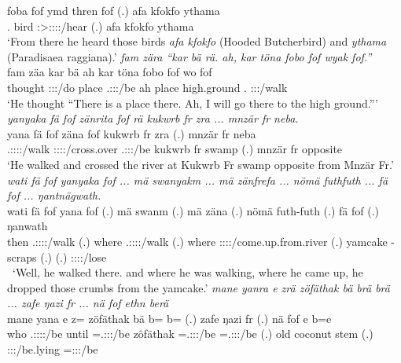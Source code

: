 \begin{exe}
	\gll foba fof ymd thren fof (.) {afa kfokfo} ythama\\ 
	\Dist.{\Abl} {\Emph} bird \Stsg:\Sbj>\Stpl:\Obj:\Irr:\Pfv:\Venit/hear {\Emph} (.) {afa kfokfo} ythama\\
	\trans `From there he heard those birds \emph{afa kfokfo} (Hooded Butcherbird) and \emph{ythama} (Paradisaea raggiana).'
	\emph{fam zära ``kar bä rä. ah, kar töna fobo fof wyak fof.''}\\
	\gll fam zäa kar bä  ah kar töna fobo fof wo fof\\ 
	thought \Sg:\Sbj:\Pst:\Pfv/do place \Med{} \Tsg.\F:\Sbj:\Nonpast:\Ipfv/be ah place high.ground \Dist.{\All} {\Emph} \Fsg:\Sbj:\Nonpast:\Ipfv/walk \Emph\\
	\trans `He thought ``There is a place there. Ah, I will go there to the high ground.'''
	\emph{yanyaka fä fof zänrita fof rä kukwrb fr zra ... mnzär fr neba.}\\
	\gll yana fä fof zäna fof  {kukwrb fr} zra (.) {mnzär fr} neba\\ 
	\Tsg.\Masc:\Sbj:\Pst:\Ipfv:\Venit/walk {\Dist} {\Emph} \Sg:\Sbj:\Pst:\Pfv:\Venit/cross.over {\Emph} \Tsg.\F:\Sbj:\Nonpast:\Ipfv/be {kukwrb fr} swamp (.) {mnzär fr} opposite\\
	\trans `He walked and crossed the river at Kukwrb Fr swamp opposite from Mnzär Fr.'
	\emph{wati fä fof yanyaka fof ... mä swanyakm ... mä zänfrefa ... nömä futhfuth ... fä fof ... ŋantnägwath.}\\
	\gll wati fä fof yana fof (.) mä swanm (.) mä zäna (.) nömä futh-futh (.) fä fof (.) ŋanwath\\ 
	then {\Dist} {\Emph} \Tsg.\Masc:\Sbj:\Pst:\Ipfv:\Venit/walk {\Emph} (.) where \Tsg.\Masc:\Sbj:\Pst:\Dur:\Venit/walk (.) where \Sg:\Sbj:\Pst:\Pfv:\Venit/come.up.from.river (.) yamcake \Redup-scraps (.) {\Dist} {\Emph} (.) \Stpl:\Sbj:\Pst:\Ipfv:\Venit/lose\\\
	\trans `Well, he walked there. and where he was walking, where he came up, he dropped those crumbs from the yamcake.'
\exi{127} 
	\emph{mane yanra e zrä zöfäthak bä brä brä ... zafe ŋazi fr ... nä fof ethn berä}\\
	\gll mane yan\stem{r}a e z= zöfäthak bä b=\stem{rä} b=\stem{rä} (.) zafe ŋazi fr (.) nä fof e b=e\\ 
	who \Tsg.\Masc:\Sbj:\Pst:\Ipfv:\Venit/be until \Prox=\Tsg.\F:\Sbj:\Nonpast:\Ipfv/be zöfäthak \Med{} \Med=\Tsg.\F:\Sbj:\Nonpast:\Ipfv/be \Med=\Tsg.\F:\Sbj:\Nonpast:\Ipfv/be (.) old coconut stem (.) {\Indf} {\Emph} \Stpl:\Sbj:\Nonpast:\Stat/be.lying \Med=\Stpl:\Sbj:\Nonpast:\Ipfv/be\\

\end{exe}
